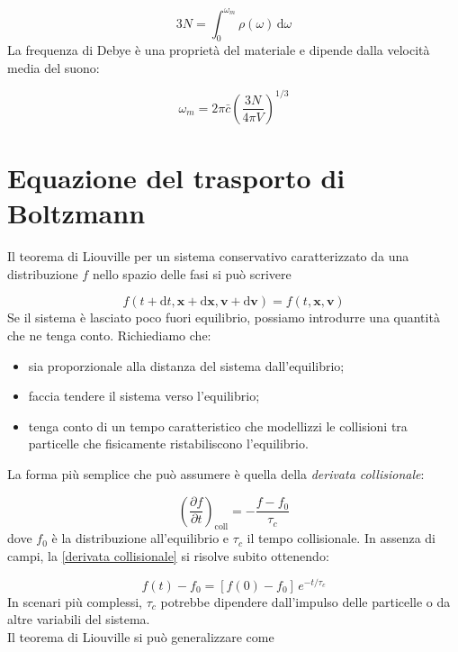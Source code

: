 \documentclass[a4paper]{report}
\begin{document}
\begin{equation}
    3N = \int_0^{\omega_m} \rho(\omega)\,\mathrm{d}\omega
\end{equation}
La frequenza di Debye è una proprietà del materiale e dipende dalla velocità media del suono:

\begin{equation}
    \omega_m = 2\pi\bar{c}\left(\frac{3N}{4\pi V}\right)^{1/3}
\end{equation}

\section{Equazione del trasporto di Boltzmann}

Il teorema di Liouville per un sistema conservativo caratterizzato da una distribuzione $f$ nello spazio delle fasi si può scrivere

\begin{equation}
    f(t+\mathrm{d}t, \mathbf{x}+\mathrm{
    d}\mathbf{x},  \mathbf{v}+\mathrm{
    d}\mathbf{v}) = f(t,\mathbf{x},\mathbf{v})
\end{equation}
Se il sistema è lasciato poco fuori equilibrio, possiamo introdurre una quantità che ne tenga conto. Richiediamo che:

\begin{itemize}
    \item sia proporzionale alla distanza del sistema dall'equilibrio;
    \item faccia tendere il sistema verso l'equilibrio;
    \item tenga conto di un tempo caratteristico che modellizzi le collisioni tra particelle che fisicamente ristabiliscono l'equilibrio.
\end{itemize}
La forma più semplice che può assumere è quella della \textit{derivata collisionale}:

\begin{equation}
    \left(\frac{\partial f}{\partial t}\right)_{\text{coll}} = -\frac{f-f_0}{\tau_c}
    \label{derivata collisionale}
\end{equation}
dove $f_0$ è la distribuzione all'equilibrio e $\tau_c$ il tempo collisionale. In assenza di campi, la \eqref{derivata collisionale} si risolve subito ottenendo:

\begin{equation}
    f(t) - f_0 = [f(0)-f_0]\, e^{-t/\tau_c}
\end{equation}
In scenari più complessi, $\tau_c$ potrebbe dipendere dall'impulso delle particelle o da altre variabili del sistema.\\
Il teorema di Liouville si può generalizzare come
\end{document}
